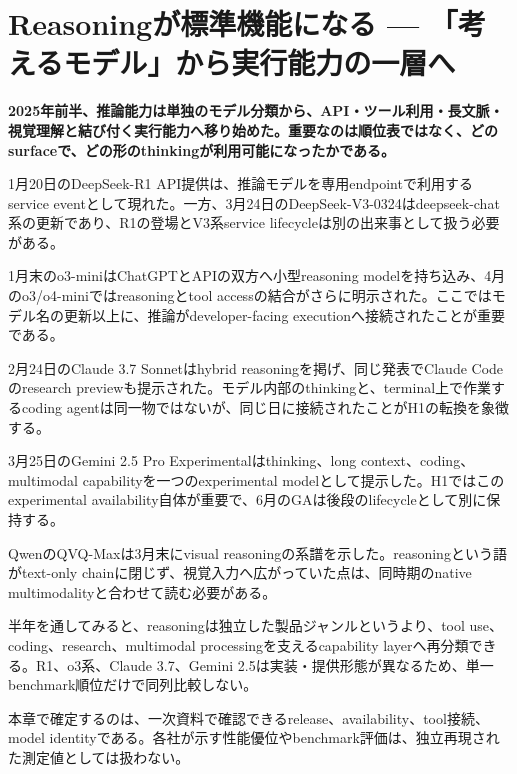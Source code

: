 \section{Reasoningが標準機能になる — 「考えるモデル」から実行能力の一層へ}
\noindent\textbf{2025年前半、推論能力は単独のモデル分類から、API・ツール利用・長文脈・視覚理解と結び付く実行能力へ移り始めた。重要なのは順位表ではなく、どのsurfaceで、どの形のthinkingが利用可能になったかである。}\autocite{src-421ee9af3f80,src-650b567698aa,src-8f8555b73e1b}

1月20日のDeepSeek-R1 API提供は、推論モデルを専用endpointで利用するservice eventとして現れた。一方、3月24日のDeepSeek-V3-0324はdeepseek-chat系の更新であり、R1の登場とV3系service lifecycleは別の出来事として扱う必要がある。\autocite{src-8f8555b73e1b}


1月末のo3-miniはChatGPTとAPIの双方へ小型reasoning modelを持ち込み、4月のo3/o4-miniではreasoningとtool accessの結合がさらに明示された。ここではモデル名の更新以上に、推論がdeveloper-facing executionへ接続されたことが重要である。\autocite{src-650b567698aa,src-bf92f3d905c3}


2月24日のClaude 3.7 Sonnetはhybrid reasoningを掲げ、同じ発表でClaude Codeのresearch previewも提示された。モデル内部のthinkingと、terminal上で作業するcoding agentは同一物ではないが、同じ日に接続されたことがH1の転換を象徴する。\autocite{src-a6c92f94a0af}


3月25日のGemini 2.5 Pro Experimentalはthinking、long context、coding、multimodal capabilityを一つのexperimental modelとして提示した。H1ではこのexperimental availability自体が重要で、6月のGAは後段のlifecycleとして別に保持する。\autocite{src-421ee9af3f80}


QwenのQVQ-Maxは3月末にvisual reasoningの系譜を示した。reasoningという語がtext-only chainに閉じず、視覚入力へ広がっていた点は、同時期のnative multimodalityと合わせて読む必要がある。\autocite{src-8cb736b33646}


半年を通してみると、reasoningは独立した製品ジャンルというより、tool use、coding、research、multimodal processingを支えるcapability layerへ再分類できる。R1、o3系、Claude 3.7、Gemini 2.5は実装・提供形態が異なるため、単一benchmark順位だけで同列比較しない。\autocite{src-421ee9af3f80,src-8f8555b73e1b,src-a6c92f94a0af,src-bf92f3d905c3}


\begin{claimboundary}
本章で確定するのは、一次資料で確認できるrelease、availability、tool接続、model identityである。各社が示す性能優位やbenchmark評価は、独立再現された測定値としては扱わない。
\end{claimboundary}
